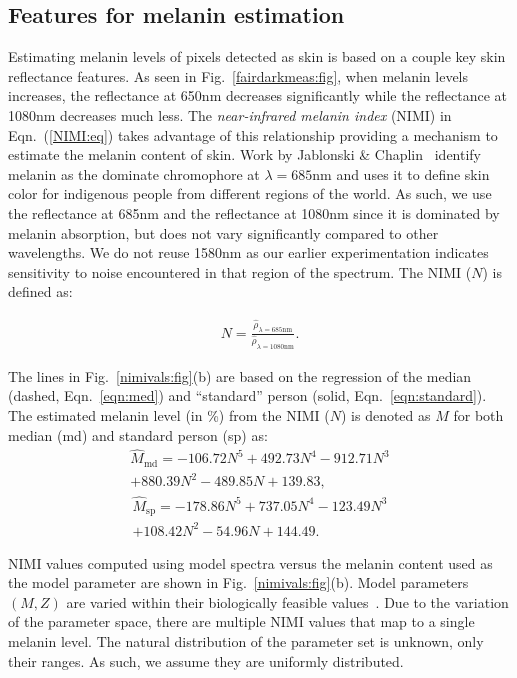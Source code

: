 \documentclass[10pt,journal,cspaper,compsoc]{IEEEtran}
\begin{document}
\subsection{Features for melanin estimation}
\label{scn:melanin_estimation}
Estimating melanin levels of pixels detected as skin is based on a couple key skin reflectance features. 
As seen in Fig.~\ref{fairdarkmeas:fig}, when melanin levels increases, the reflectance at 650nm decreases 
significantly while the reflectance at 1080nm decreases much less. The \textit{near-infrared melanin 
index} (NIMI) in Eqn.~(\ref{NIMI:eq}) takes advantage of this relationship providing a mechanism to estimate the 
melanin content of skin.  Work by Jablonski \& Chaplin~\cite{Jablonski1} identify melanin as the dominate 
chromophore at $\lambda=685\text{nm}$ and uses it to define skin color for indigenous people from different regions 
of the world. As such, we use the reflectance at 685nm and the reflectance at 1080nm since it is dominated by 
melanin absorption, but does not vary significantly compared to other wavelengths.  We do not reuse 1580nm 
as our earlier experimentation indicates sensitivity to noise encountered in that region of the spectrum.  The 
NIMI ($N$) is defined as:

\begin{align}\label{NIMI:eq}
N = \frac{\hat{\rho}_{\lambda=685\text{nm}}}{\hat{\rho}_{\lambda=1080\text{nm}}}.
\end{align}

The lines in 
Fig.~\ref{nimivals:fig}(b) are based on the regression of the median (dashed, Eqn.~\ref{eqn:med}) and 
``standard'' person (solid, Eqn.~\ref{eqn:standard}). The estimated melanin level (in \%) from the NIMI ($N$) is denoted 
as $\hat{M}$ for both median (md) and standard person (sp) as: 
\begin{align}
\label{eqn:med}
\hat{M}_{\text{md}} = -106.72N^5 + 492.73N^4 - 912.71N^3 \\ \nonumber
               +880.39N^2 - 489.85N + 139.83, 
\end{align}
\begin{align}
\label{eqn:standard}
\hat{M}_{\text{sp}} = -178.86N^5 + 737.05N^4 - 123.49N^3  \\ \nonumber 
               +108.42N^2 - 54.96N + 144.49.
\end{align}

NIMI values computed using model spectra versus the melanin content used as the model parameter are shown in Fig.~\ref{nimivals:fig}(b).  
Model parameters $\left(M,Z\right)$ are varied within their biologically feasible values~\cite{Nunez8}. Due to the variation of the 
parameter space, there are multiple NIMI values that map to a single melanin level.  The natural distribution of the parameter 
set is unknown, only their ranges.  As such, we assume they are uniformly distributed. 
\end{document}
